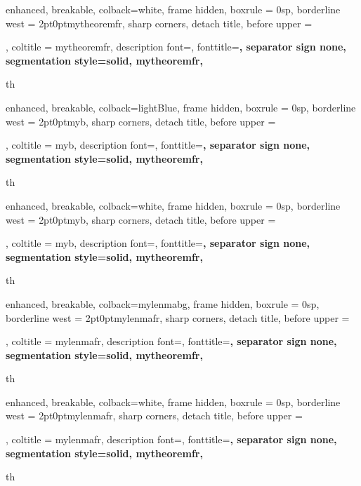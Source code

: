 {
	enhanced,
	breakable,
	colback=white,
	frame hidden,
	boxrule = 0sp,
	borderline west = {2pt}{0pt}{mytheoremfr},
	sharp corners,
	detach title,
	before upper = \tcbtitle\par\smallskip,
	coltitle = mytheoremfr,
	description font=\selectfont,
	fonttitle=\selectfont\bfseries,
	separator sign none,
	segmentation style={solid, mytheoremfr},
}
{th}




{
	enhanced,
	breakable,
	colback=lightBlue,
	frame hidden,
	boxrule = 0sp,
	borderline west = {2pt}{0pt}{myb},
	sharp corners,
	detach title,
	before upper = \tcbtitle\par\smallskip,
	coltitle = myb,
	description font=\selectfont,
	fonttitle=\selectfont\bfseries,
	separator sign none,
	segmentation style={solid, mytheoremfr},
}
{th}



{
	enhanced,
	breakable,
	colback=white,
	frame hidden,
	boxrule = 0sp,
	borderline west = {2pt}{0pt}{myb},
	sharp corners,
	detach title,
	before upper = \tcbtitle\par\smallskip,
	coltitle = myb,
	description font=\mdseries{}\selectfont,
	fonttitle=\selectfont\bfseries,
	separator sign none,
	segmentation style={solid, mytheoremfr},
}
{th}



{
	enhanced,
	breakable,
	colback=mylenmabg,
	frame hidden,
	boxrule = 0sp,
	borderline west = {2pt}{0pt}{mylenmafr},
	sharp corners,
	detach title,
	before upper = \tcbtitle\par\smallskip,
	coltitle = mylenmafr,
	description font=\mdseries{}\selectfont,
	fonttitle=\selectfont\bfseries,
	separator sign none,
	segmentation style={solid, mytheoremfr},
}
{th}


{
	enhanced,
	breakable,
	colback=white,
	frame hidden,
	boxrule = 0sp,
	borderline west = {2pt}{0pt}{mylenmafr},
	sharp corners,
	detach title,
	before upper = \tcbtitle\par\smallskip,
	coltitle = mylenmafr,
	description font=\selectfont,
	fonttitle=\selectfont\bfseries,
	separator sign none,
	segmentation style={solid, mytheoremfr},
}
{th}


